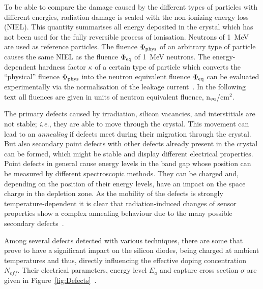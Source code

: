 To be able to compare the damage caused by the different types of particles with different energies, 
radiation damage is scaled with the non-ionizing energy loss (NIEL). This quantity summarises all 
energy deposited in the crystal which has not been used for the fully reversible process of ionisation. 
Neutrons of 1~MeV are used as reference particles. The fluence $\Phi_{\rm phys}$ of an arbitrary type 
of particle causes the same NIEL as the fluence $\Phi_{\rm eq}$ of 1~MeV neutrons.
The energy-dependent hardness factor $\kappa$ of a certain type of particle which converts the 
``physical'' fluence $\Phi_{\rm phys}$ into the neutron equivalent fluence $\Phi_{\rm eq}$ can be 
evaluated experimentally via the normalisation of the leakage 
current~\cite{MOLL2002100,rossi2006pixel}. In the following text all fluences are given in units of neutron equivalent fluence, n$_{\rm eq}$/cm$^2$. 

The primary defects caused by irradiation, silicon vacancies, and interstitials are not stable; {\it i.e.}, 
they 
are able to move through the crystal. This movement can lead to an {\it annealing} if defects 
meet during 
their migration through the crystal. But also secondary point defects with other defects already present 
in the crystal can be formed, which might be stable and display different electrical properties. Point 
defects in general cause energy levels in the band gap whose position can be measured by different 
spectroscopic methods. They can be charged and, depending on the position of their energy levels, 
have an impact on the space charge in the depletion zone. As the mobility of the defects is strongly 
temperature-dependent it is clear that radiation-induced changes of sensor properties show a complex 
annealing behaviour due to the many possible secondary defects~\cite{rossi2006pixel}.


Among several defects detected with various techniques, there are some that prove to have a significant impact
on the silicon diodes, being charged at ambient temperatures and thus, directly influencing the 
effective doping concentration $N_{eff}$. Their electrical parameters, energy level $E_a$ 
and capture cross section $\sigma$ are given in Figure~\ref{fig:Defects}~\cite{DefectsVertexing2016}.

